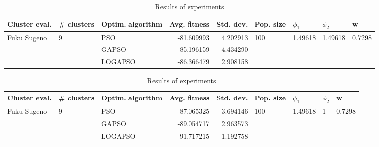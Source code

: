 \documentclass{article}
\begin{document}
\begin{table}
\centering
\caption{Results of experiments}
\begin{tabular}{lllrrllll}
\toprule
               Cluster eval. &        \# clusters & Optim. algorithm &  Avg. fitness &  Std. dev. &            Pop. size &               $\phi_{1}$ &               $\phi_{2}$ &                       w \\
\midrule
\multirow{3}{*}{Fuku Sugeno} & \multirow{3}{*}{9} &              PSO &    -81.609993 &   4.202913 & \multirow{3}{*}{100} & \multirow{3}{*}{1.49618} & \multirow{3}{*}{1.49618} & \multirow{3}{*}{0.7298} \\
                             &                    &            GAPSO &    -85.196159 &   4.434290 &                      &                          &                          &                         \\
                             &                    &          LOGAPSO &    -86.366479 &   2.908158 &                      &                          &                          &                         \\
\bottomrule
\end{tabular}
\end{table}
\begin{table}
\centering
\caption{Results of experiments}
\begin{tabular}{lllrrllll}
\toprule
               Cluster eval. &        \# clusters & Optim. algorithm &  Avg. fitness &  Std. dev. &            Pop. size &               $\phi_{1}$ &         $\phi_{2}$ &                       w \\
\midrule
\multirow{3}{*}{Fuku Sugeno} & \multirow{3}{*}{9} &              PSO &    -87.065325 &   3.694146 & \multirow{3}{*}{100} & \multirow{3}{*}{1.49618} & \multirow{3}{*}{1} & \multirow{3}{*}{0.7298} \\
                             &                    &            GAPSO &    -89.054717 &   2.963573 &                      &                          &                    &                         \\
                             &                    &          LOGAPSO &    -91.717215 &   1.192758 &                      &                          &                    &                         \\
\bottomrule
\end{tabular}
\end{table}
\end{document}
